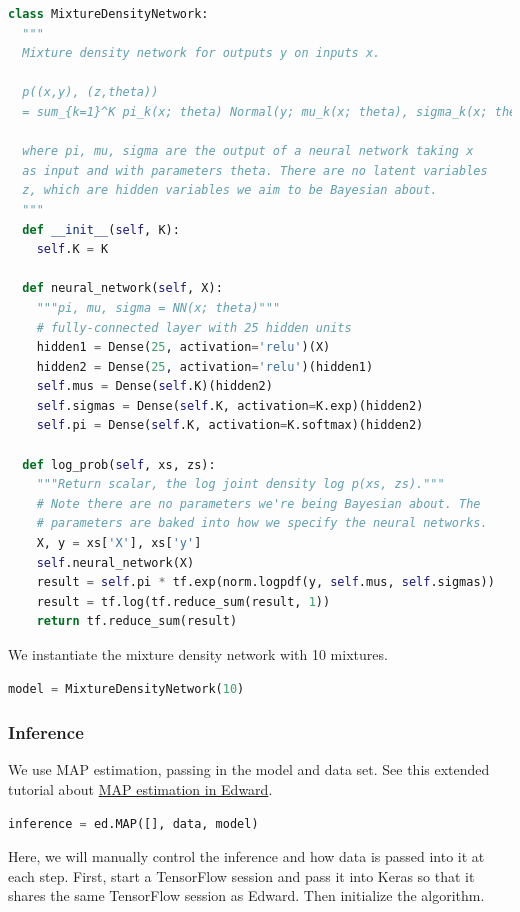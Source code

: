 \begin{lstlisting}[language=Python]
class MixtureDensityNetwork:
  """
  Mixture density network for outputs y on inputs x.

  p((x,y), (z,theta))
  = sum_{k=1}^K pi_k(x; theta) Normal(y; mu_k(x; theta), sigma_k(x; theta))

  where pi, mu, sigma are the output of a neural network taking x
  as input and with parameters theta. There are no latent variables
  z, which are hidden variables we aim to be Bayesian about.
  """
  def __init__(self, K):
    self.K = K

  def neural_network(self, X):
    """pi, mu, sigma = NN(x; theta)"""
    # fully-connected layer with 25 hidden units
    hidden1 = Dense(25, activation='relu')(X)
    hidden2 = Dense(25, activation='relu')(hidden1)
    self.mus = Dense(self.K)(hidden2)
    self.sigmas = Dense(self.K, activation=K.exp)(hidden2)
    self.pi = Dense(self.K, activation=K.softmax)(hidden2)

  def log_prob(self, xs, zs):
    """Return scalar, the log joint density log p(xs, zs)."""
    # Note there are no parameters we're being Bayesian about. The
    # parameters are baked into how we specify the neural networks.
    X, y = xs['X'], xs['y']
    self.neural_network(X)
    result = self.pi * tf.exp(norm.logpdf(y, self.mus, self.sigmas))
    result = tf.log(tf.reduce_sum(result, 1))
    return tf.reduce_sum(result)
\end{lstlisting}

We instantiate the mixture density network with 10 mixtures.

\begin{lstlisting}[language=Python]
model = MixtureDensityNetwork(10)
\end{lstlisting}

\subsubsection{Inference}

We use MAP estimation, passing
in the model and data set.
See this extended tutorial about
\href{tut_MAP}{MAP estimation in Edward}.

\begin{lstlisting}[language=Python]
inference = ed.MAP([], data, model)
\end{lstlisting}

Here, we will manually control the inference and how data is passed
into it at each step. First, start a TensorFlow session and pass it
into Keras so that it shares the same TensorFlow session as Edward.
Then initialize the algorithm.

